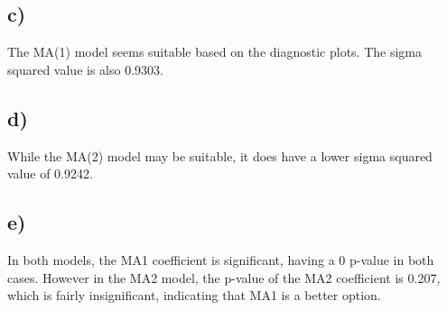 \documentclass[paper=a4, fontsize=11pt]{scrartcl} %
\numberwithin{equation}{section} %
\numberwithin{figure}{section} %
\numberwithin{table}{section} %
\begin{document}
\subsection*{c)}
The MA(1) model seems suitable based on the diagnostic plots. The sigma squared value is also 0.9303.


\subsection*{d)}
While the MA(2) model may be suitable, it does have a lower sigma squared value of 0.9242.


\subsection*{e)}
In both models, the MA1 coefficient is significant, having a 0 p-value in both cases. However in the MA2 model, the p-value of the MA2 coefficient is 0.207, which is fairly insignificant, indicating that MA1 is a better option.
\end{document}
